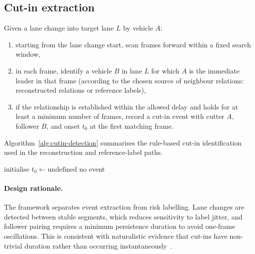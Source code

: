 \documentclass[12pt,a4paper,twoside,openright]{report}
\begin{document}
    \subsection{Cut-in extraction}
    Given a lane change into target lane $L$ by vehicle $A$:
    \begin{enumerate}[leftmargin=1.6em]
  \item starting from the lane change start, scan frames forward within a fixed search window,
  \item in each frame, identify a vehicle $B$ in lane $L$ for which $A$ is the immediate leader in that frame (according to the chosen source of neighbour relations: reconstructed relations or reference labels),
  \item if the relationship is established within the allowed delay and holds for at least a minimum number of frames, record a cut-in event with cutter $A$, follower $B$, and onset $t_0$ at the first matching frame.
    \end{enumerate}

    Algorithm~\ref{alg:cutin-detection} summarises the rule-based cut-in identification used in the reconstruction and reference-label paths.

    \begin{algorithm}[H]
\caption{Cut-in identification as a cutter--follower pair}
\label{alg:cutin-detection}

initialise $t_0 \leftarrow \text{undefined}$\;
\Return no event\;
    \end{algorithm}

    \paragraph{Design rationale.}
    The framework separates event extraction from risk labelling. Lane changes are detected between stable segments, which reduces sensitivity to label jitter, and follower pairing requires a minimum persistence duration to avoid one-frame oscillations. This is consistent with naturalistic evidence that cut-ins have non-trivial duration rather than occurring instantaneously~\cite{wang2019cutin}.
\end{document}
